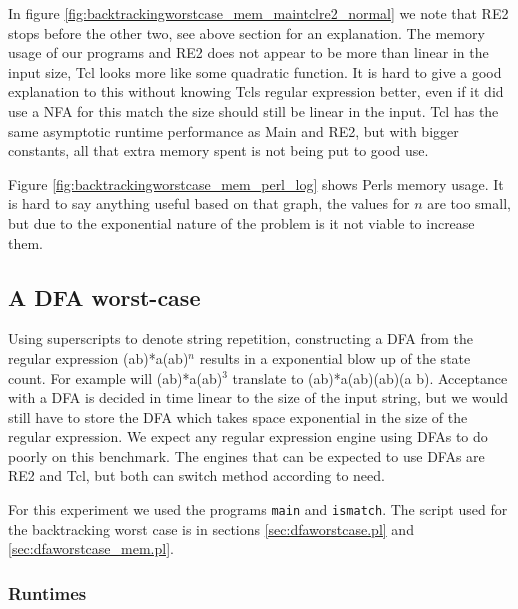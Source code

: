 In figure \vref{fig:backtrackingworstcase_mem_maintclre2_normal} we
note that RE2 stops before the other two, see above section for an
explanation. The memory usage of our programs and RE2 does not appear
to be more than linear in the input size, Tcl looks more like some
quadratic function. It is hard to give a good explanation to this
without knowing Tcls regular expression better, even if it did use a
NFA for this match the size should still be linear in the input. Tcl
has the same asymptotic runtime performance as Main and RE2, but with
bigger constants, all that extra memory spent is not being put to
good use. 

Figure \vref{fig:backtrackingworstcase_mem_perl_log} shows Perls
memory usage. It is hard to say anything useful based on that graph,
the values for $n$ are too small, but due to the exponential nature of
the problem is it not viable to increase them.

\subsection{A DFA worst-case}

Using superscripts to denote string repetition, constructing a DFA
from the regular expression \textsf{(a\textbar b)*a(a\textbar b)$^n$}
results in a exponential blow up of the state count. For example will
\textsf{(a\textbar b)*a(a\textbar b)$^3$} translate to
\textsf{(a\textbar b)*a(a\textbar b)(a\textbar b)(a\textbar
  b)}. Acceptance with a DFA is decided in time linear to the size of
the input string, but we would still have to store the DFA which takes
space exponential in the size of the regular expression. We expect any
regular expression engine using DFAs to do poorly on this
benchmark. The engines that can be expected to use DFAs are RE2 and
Tcl, but both can switch method according to need. 


For this experiment we used the programs \texttt{main} and
\texttt{ismatch}. The script used for the backtracking worst case is
in sections \vref{sec:dfaworstcase.pl} and
\vref{sec:dfaworstcase_mem.pl}.


\subsubsection{Runtimes}

